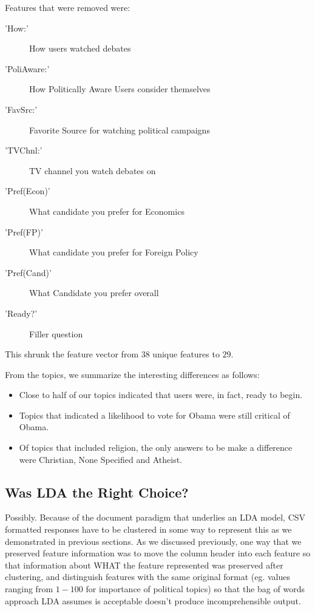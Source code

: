 Features that were removed were:
\begin{description}
\item['How:'] How users watched debates
\item['PoliAware:'] How Politically Aware Users consider themselves
\item['FavSrc:'] Favorite Source for watching political campaigns
\item['TVChnl:'] TV channel you watch debates on
\item['Pref(Econ)'] What candidate you prefer for Economics
\item['Pref(FP)'] What candidate you prefer for Foreign Policy
\item['Pref(Cand)'] What Candidate you prefer overall
\item['Ready?'] Filler question
\end{description}
 This shrunk the feature vector from $38$ unique features to $29$.


From the topics, we summarize the interesting differences as follows:
\begin{itemize}
\item Close to half of our topics indicated that users were, in fact, ready to begin.
\item Topics that indicated a likelihood to vote for Obama were still critical of Obama.
\item Of topics that included religion, the only answers to be make a difference were Christian, None Specified and Atheist.

\end{itemize}



\subsection{Was LDA the Right Choice?}
Possibly. Because of the document paradigm that underlies an LDA model, CSV formatted responses have to be clustered in some way to represent this as we demonstrated in previous sections. As we discussed previously, one way that we preserved feature information was to move the column header into each feature so that information about WHAT the feature represented was preserved after clustering, and distinguish features with the same original format (eg. values ranging from $1 - 100$ for importance of political topics) so that the bag of words approach LDA assumes is acceptable doesn't produce incomprehensible output.

